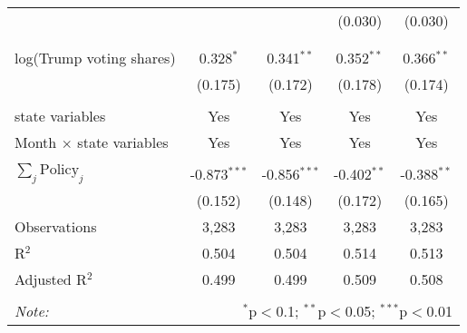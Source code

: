 \begin{tabular}{@{\extracolsep{1pt}}lcccc}
  &  &  & (0.030) & (0.030) \\ 
   &  &  &  &  \\ 
  &  &  &  &  \\ 
  log(Trump voting shares) & 0.328$^{*}$ & 0.341$^{**}$ & 0.352$^{**}$ & 0.366$^{**}$ \\ 
  & (0.175) & (0.172) & (0.178) & (0.174) \\ 
 \hline \\[-1.8ex] 
state variables & Yes & Yes & Yes & Yes \\ 
Month $\times$ state variables & Yes & Yes & Yes & Yes \\ 
\hline \\[-1.8ex] 
$\sum_j \mathrm{Policy}_j$ & -0.873$^{***}$ & -0.856$^{***}$ & -0.402$^{**}$ & -0.388$^{**}$ \\ 
 & (0.152) & (0.148) & (0.172) & (0.165) \\ 
Observations & 3,283 & 3,283 & 3,283 & 3,283 \\ 
R$^{2}$ & 0.504 & 0.504 & 0.514 & 0.513 \\ 
Adjusted R$^{2}$ & 0.499 & 0.499 & 0.509 & 0.508 \\ 
\hline 
\hline \\[-1.8ex] 
\textit{Note:}  & \multicolumn{4}{r}{$^{*}$p$<$0.1; $^{**}$p$<$0.05; $^{***}$p$<$0.01} \\ 
\end{tabular} 